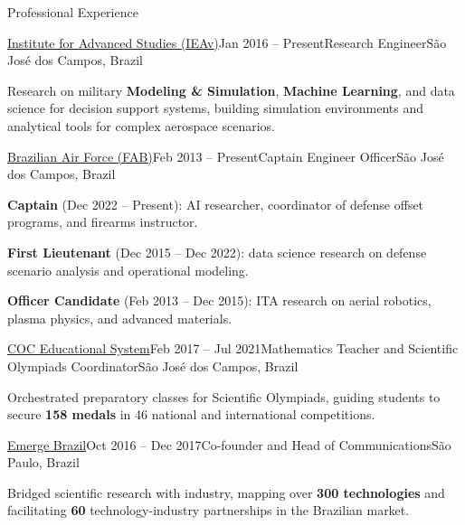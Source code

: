 \documentclass{resume} %
\begin{document}

\begin{rSection}{Professional Experience}

\begin{rSubsection}{\href{https://ieav.dcta.mil.br/}{Institute for Advanced Studies (IEAv)}}{Jan 2016 -- Present}{Research Engineer}{São José dos Campos, Brazil}
    \item Research on military \textbf{Modeling \& Simulation}, \textbf{Machine Learning}, and data science for decision support systems, building simulation environments and analytical tools for complex aerospace scenarios.
\end{rSubsection}

\begin{rSubsection}{\href{https://www.fab.mil.br/index.php}{Brazilian Air Force (FAB)}}{Feb 2013 -- Present}{Captain Engineer Officer}{São José dos Campos, Brazil}
    \item \textbf{Captain} (Dec 2022 -- Present): AI researcher, coordinator of defense offset programs, and firearms instructor.
    \item \textbf{First Lieutenant} (Dec 2015 -- Dec 2022): data science research on defense scenario analysis and operational modeling.
    \item \textbf{Officer Candidate} (Feb 2013 -- Dec 2015): ITA research on aerial robotics, plasma physics, and advanced materials.
\end{rSubsection}

\begin{rSubsection}{\href{https://site.coc.com.br/}{COC Educational System}}{Feb 2017 -- Jul 2021}{Mathematics Teacher and Scientific Olympiads Coordinator}{São José dos Campos, Brazil}
    \item Orchestrated preparatory classes for Scientific Olympiads, guiding students to secure \textbf{158 medals} in 46 national and international competitions.
\end{rSubsection}

\begin{rSubsection}{\href{https://emergebrasil.in/en/}{Emerge Brazil}}{Oct 2016 -- Dec 2017}{Co-founder and Head of Communications}{São Paulo, Brazil}
    \item Bridged scientific research with industry, mapping over \textbf{300 technologies} and facilitating \textbf{60} technology-industry partnerships in the Brazilian market.
\end{rSubsection}

\end{rSection}
\end{document}
